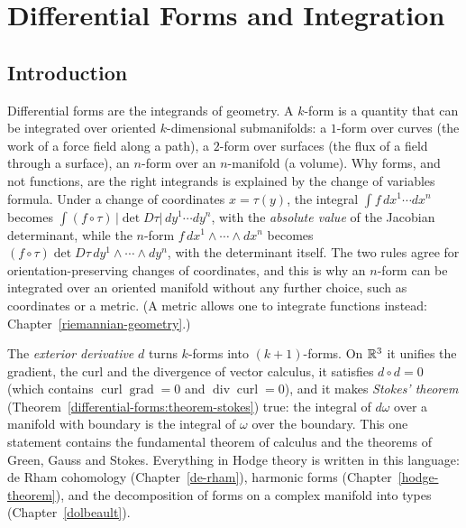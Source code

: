 \chapter{Differential Forms and Integration}\label{differential-forms}

\section{Introduction}\label{differential-forms:section-introduction}

Differential forms are the integrands of geometry. A $k$-form is a quantity that can be integrated over oriented $k$-dimensional submanifolds: a $1$-form over curves (the
work of a force field along a path), a $2$-form over surfaces (the flux of a field through a surface), an $n$-form over an $n$-manifold (a volume). Why forms, and not functions,
are the right integrands is explained by the change of variables formula. Under a change of coordinates $x = \tau(y)$, the integral $\int f\,dx^1 \cdots dx^n$ becomes
$\int(f \circ \tau)\,|\det D\tau|\,dy^1 \cdots dy^n$, with the \emph{absolute value} of the Jacobian determinant, while the $n$-form $f\,dx^1 \wedge \cdots \wedge dx^n$ becomes
$(f \circ \tau)\det D\tau\,dy^1 \wedge \cdots \wedge dy^n$, with the determinant itself. The two rules agree for orientation-preserving changes of coordinates, and this is why an
$n$-form can be integrated over an oriented manifold without any further choice, such as coordinates or a metric. (A metric allows one to integrate functions instead:
Chapter~\ref{riemannian-geometry}.)

The \emph{exterior derivative} $d$ turns $k$-forms into $(k + 1)$-forms. On $\mathbb{R}^3$ it unifies the gradient, the curl and the divergence of vector calculus, it satisfies
$d \circ d = 0$ (which contains $\operatorname{curl}\operatorname{grad} = 0$ and $\operatorname{div}\operatorname{curl} = 0$), and it makes \emph{Stokes' theorem}
(Theorem~\ref{differential-forms:theorem-stokes}) true: the integral of $d\omega$ over a manifold with boundary is the integral of $\omega$ over the boundary. This one statement
contains the fundamental theorem of calculus and the theorems of Green, Gauss and Stokes. Everything in Hodge theory is written in this language: de Rham cohomology
(Chapter~\ref{de-rham}), harmonic forms (Chapter~\ref{hodge-theorem}), and the decomposition of forms on a complex manifold into types (Chapter~\ref{dolbeault}).

